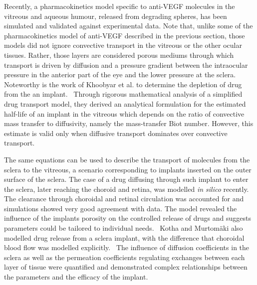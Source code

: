 \documentclass[12pt,a4paper]{journal}
\begin{document}
Recently, a pharmacokinetics model specific to anti-VEGF molecules in the vitreous and aqueous humour, released from degrading spheres, has been simulated and validated against experimental data.\cite{Heljak_2022}
Note that, unlike some of the pharmacokinetics model of anti-VEGF described in the previous section, those models did not ignore convective transport in the vitreous or the other ocular tissues.
Rather, those layers are considered porous mediums through which transport is driven by diffusion and a pressure gradient between the intraocular pressure in the anterior part of the eye and the lower pressure at the sclera.~\cite{Ferreira_2018,Ferreira_2020,Heljak_2022,Khoobyar_2021,Li_2022}
Noteworthy is the work of Khoobyar et al. to determine the depletion of drug from the an implant.~\cite{Khoobyar_2022}
Through rigorous mathematical analysis of a simplified drug transport model, they derived an analytical formulation for the estimated half-life of an implant in the vitreous which depends on the ratio of convective mass transfer to diffusivity, namely the mass-transfer Biot number.
However, this estimate is valid only when diffusive transport dominates over convective transport.



The same equations can be used to describe the transport of molecules from the sclera to the vitreous, a scenario corresponding to implants inserted on the outer surface of the sclera.
The case of a drug diffusing through such implant to enter the sclera, later reaching the choroid and retina, was modelled \textit{in silico} recently.~\cite{Abootorabi_2021}
The clearance through choroidal and retinal circulation was accounted for and simulations showed very good agreement with data.
The model revealed the influence of the implants porosity on the controlled release of drugs and suggests parameters could be tailored to individual needs.~\cite{Abootorabi_2021}
Kotha and Murtom\"aki also modelled drug release from a sclera implant, with the difference that choroidal blood flow was modelled explicitly.~\cite{Kotha_2014}
The influence of diffusion coefficients in the sclera as well as the permeation coefficients regulating exchanges between each layer of tissue were quantified and demonstrated complex relationships between the parameters and the efficacy of the implant.
\end{document}
